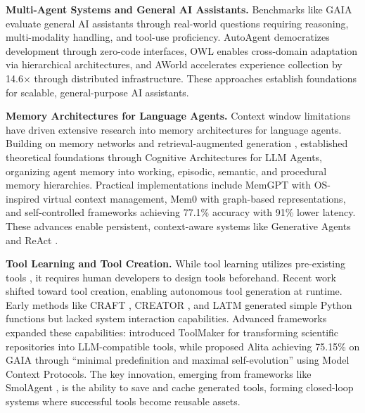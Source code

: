 \documentclass{article} %
\begin{document}
\textbf{Multi-Agent Systems and General AI Assistants.} Benchmarks like GAIA \citep{mialon2023gaia} evaluate general AI assistants through real-world questions requiring reasoning, multi-modality handling, and tool-use proficiency. AutoAgent \citep{tang2025autoagent} democratizes development through zero-code interfaces, OWL \citep{hu2025owl} enables cross-domain adaptation via hierarchical architectures, and AWorld \citep{yu2025aworld} accelerates experience collection by 14.6× through distributed infrastructure. These approaches establish foundations for scalable, general-purpose AI assistants.

\textbf{Memory Architectures for Language Agents.} Context window limitations have driven extensive research into memory architectures for language agents. Building on memory networks \citep{weston2014memory} and retrieval-augmented generation \citep{lewis2020retrieval}, \citet{sumers2023cognitive} established theoretical foundations through Cognitive Architectures for LLM Agents, organizing agent memory into working, episodic, semantic, and procedural memory hierarchies. Practical implementations include MemGPT \citep{packer2023memgpt} with OS-inspired virtual context management, Mem0 \citep{chhikara2025mem0} with graph-based representations, and self-controlled frameworks \citep{wang2023enhancing} achieving 77.1\% accuracy with 91\% lower latency. These advances enable persistent, context-aware systems like Generative Agents \citep{park2023generative} and ReAct \citep{yao2022react}.

\textbf{Tool Learning and Tool Creation.} While tool learning utilizes pre-existing tools \citep{schick2023toolformer}, it requires human developers to design tools beforehand. Recent work shifted toward tool creation, enabling autonomous tool generation at runtime. Early methods like CRAFT \citep{yuan2024craft}, CREATOR \citep{qian2023creator}, and LATM \citep{cai2024toolmakers} generated simple Python functions but lacked system interaction capabilities. Advanced frameworks expanded these capabilities: \citet{wolflein2025llm} introduced ToolMaker for transforming scientific repositories into LLM-compatible tools, while \citet{qiu2025alita} proposed Alita achieving 75.15\% on GAIA through ``minimal predefinition and maximal self-evolution'' using Model Context Protocols. The key innovation, emerging from frameworks like SmolAgent \citep{smolagents}, is the ability to save and cache generated tools, forming closed-loop systems where successful tools become reusable assets.
\end{document}

